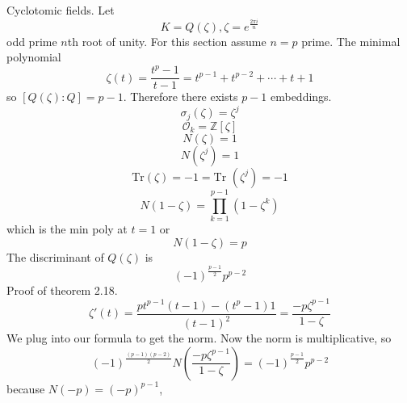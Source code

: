 \documentclass{article}
\begin{document}
Cyclotomic fields. Let
\[ K = Q(\zeta), \zeta = e^{\frac{2 \pi i}{n}} \]
odd prime $n$th root of unity. 
For this section assume $n = p$ prime. The minimal polynomial 
\[ \zeta(t) = \frac{t^p - 1}{t - 1} = t^{p-1}+t^{p-2}+\cdots+t+1 \]
so $[Q(\zeta):Q] = p-1$. Therefore there exists $p-1$ embeddings. 
\[ \sigma_j(\zeta) = \zeta^j \]
\[ \mathcal{O}_k = \mathbb{Z}[\zeta] \]
\[ N(\zeta) = 1 \]
\[ N(\zeta^j) = 1 \]
\[ \text{Tr}(\zeta) = -1 =\text{Tr }(\zeta^j) = -1 \]
\[ N(1 - \zeta) = \prod_{k = 1}^{p-1} (1 - \zeta^k) \]
which is the min poly at $t = 1$ or
\[ N(1 - \zeta) = p \]
The discriminant of $Q(\zeta)$ is 
\[ (-1)^{\frac{p-1}{2}} p^{p-2} \]
Proof of theorem 2.18. 
\[ \zeta'(t) = \frac{pt^{p-1} (t-1) - (t^p - 1)1}{(t-1)^2} =
\frac{-p\zeta^{p-1}}{1-\zeta} \]
We plug into our formula to get the norm. Now the norm is multiplicative, so 
\[ (-1)^{\frac{(p-1)(p-2)}{2}} N( \frac{-p\zeta^{p-1}}{1-\zeta}) =
(-1)^{\frac{p-1}{2}} p^{p-2} \]
because $N(-p) = (-p)^{p-1}$, 
\end{document}
